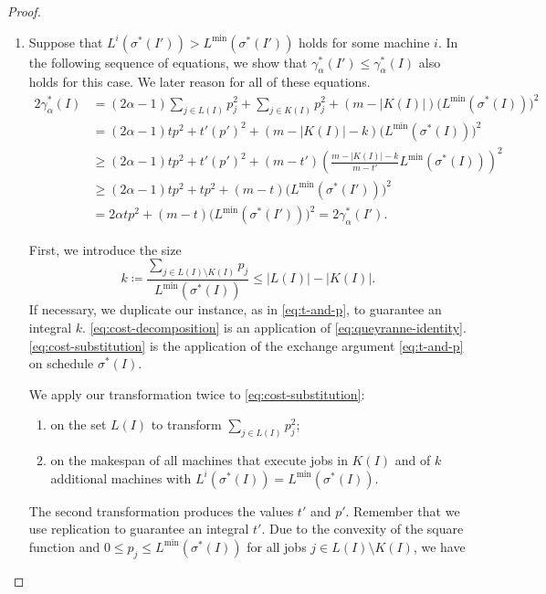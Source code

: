 \documentclass[%
english, titlepage=false %
]{./tum-templates/book/tumbook}
\begin{document}
\begin{proof}
\begin{enumerate}[label=(\arabic*)]
\item Suppose that
$L^{i}(\sigma^{*}(I'))>L^{\min}(\sigma^{*}(I'))$ holds for some machine $i$.
In the following sequence of equations, we show that $\gamma^{*}_{\alpha}(I')\leq \gamma^{*}_{\alpha}(I)$
also holds for this case. We later reason for all of these equations.
\begin{align}
    2\gamma^{*}_{\alpha}(I)
    &=
    (2\alpha-1)\sum_{j\in L(I)}p_j^2
    +\sum_{j\in K(I)}p_j^2
    +(m-|K(I)|)\bigl(L^{\min}(\sigma^{*}(I))\bigr)^2
    \label{eq:cost-decomposition}
    \\
    &=
    (2\alpha-1)tp^2+t'(p')^2
    +(m-|K(I)|-k)\bigl(L^{\min}(\sigma^{*}(I))\bigr)^2
    \label{eq:cost-substitution}
    \\
    &\geq
    (2\alpha-1)tp^2+t'(p')^2
    +(m-t')
    \left(
        \frac{m-|K(I)|-k}{m-t'}L^{\min}(\sigma^{*}(I))
    \right)^2
    \label{eq:cost-first-bound}
    \\
    &\geq
    (2\alpha-1)tp^2+tp^2
    +(m-t)\bigl(L^{\min}(\sigma^{*}(I'))\bigr)^2
    \label{eq:cost-second-bound}
    \\
    &=
    2\alpha tp^2
    +(m-t)\bigl(L^{\min}(\sigma^{*}(I'))\bigr)^2
    =
    2\gamma^{*}_{\alpha}(I').
    \label{eq:cost-final}
\end{align}

First, we introduce the size
\[
        k\coloneqq
        \frac{\sum_{j\in L(I)\setminus K(I)}p_j}
        {L^{\min}(\sigma^{*}(I))}
        \leq
        |L(I)|-|K(I)|.
\]
If necessary, we duplicate our instance, as in \eqref{eq:t-and-p}, to guarantee an integral $k$.
\eqref{eq:cost-decomposition} is an application of \eqref{eq:queyranne-identity}. \eqref{eq:cost-substitution} is
the application of the exchange argument \eqref{eq:t-and-p} on schedule $\sigma^{*}(I)$.\medskip

We apply our transformation twice to \eqref{eq:cost-substitution}:
\begin{enumerate}[label=(\alph*)]
\item on the set $L(I)$ to transform $\sum_{j\in L(I)}p_j^2$;
\item on the makespan of all machines that execute jobs in $K(I)$ and of
$k$ additional machines with
$L^{i}(\sigma^{*}(I))=L^{\min}(\sigma^{*}(I))$.
\end{enumerate}
The second transformation produces the values $t'$ and $p'$. Remember that
we use replication to guarantee an integral $t'$. Due to the convexity of the
square function and $0\leq p_j\leq L^{\min}(\sigma^{*}(I))$ for all jobs
$j\in L(I)\setminus K(I)$, we have


\end{enumerate}
\end{proof}
\end{document}
